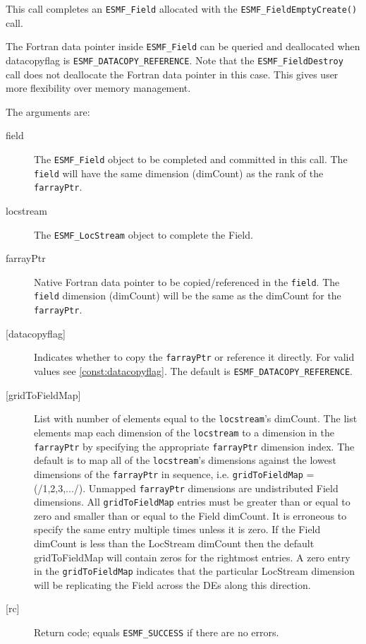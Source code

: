  
   This call completes an {\tt ESMF\_Field} allocated with the 
   {\tt ESMF\_FieldEmptyCreate()} call. 
   
   \begin{sloppypar} 
   The Fortran data pointer inside {\tt ESMF\_Field} can be queried and deallocated when 
   datacopyflag is {\tt ESMF\_DATACOPY\_REFERENCE}. Note that the {\tt ESMF\_FieldDestroy} call does not deallocate 
   the Fortran data pointer in this case. This gives user more flexibility over memory management. 
   \end{sloppypar} 
   
   The arguments are: 
   \begin{description} 
   \item [field] 
   The {\tt ESMF\_Field} object to be completed and 
   committed in this call. The {\tt field} will have the same dimension 
   (dimCount) as the rank of the {\tt farrayPtr}. 
   \item [locstream] 
   The {\tt ESMF\_LocStream} object to complete the Field. 
   \item [farrayPtr] 
   Native Fortran data pointer to be copied/referenced in the {\tt field}. 
   The {\tt field} dimension (dimCount) will be the same as the dimCount 
   for the {\tt farrayPtr}. 
   \item [{[datacopyflag]}] 
   Indicates whether to copy the {\tt farrayPtr} or reference it directly. 
   For valid values see \ref{const:datacopyflag}. The default is 
   {\tt ESMF\_DATACOPY\_REFERENCE}. 
   \item [{[gridToFieldMap]}] 
   List with number of elements equal to the 
   {\tt locstream}'s dimCount. The list elements map each dimension 
   of the {\tt locstream} to a dimension in the {\tt farrayPtr} by 
   specifying the appropriate {\tt farrayPtr} dimension index. The 
   default is to map all of the {\tt locstream}'s dimensions against the 
   lowest dimensions of the {\tt farrayPtr} in sequence, i.e. 
   {\tt gridToFieldMap} = (/1,2,3,.../). 
   Unmapped {\tt farrayPtr} dimensions are undistributed Field 
   dimensions. 
   All {\tt gridToFieldMap} entries must be greater than or equal 
   to zero and smaller than or equal to the Field dimCount. It is erroneous 
   to specify the same entry multiple times unless it is zero. 
   If the Field dimCount is less than the LocStream dimCount then the default 
   gridToFieldMap will contain zeros for the rightmost entries. A zero 
   entry in the {\tt gridToFieldMap} indicates that the particular 
   LocStream dimension will be replicating the Field across the DEs along 
   this direction. 
   \item [{[rc]}] 
   Return code; equals {\tt ESMF\_SUCCESS} if there are no errors. 
   \end{description} 
    
